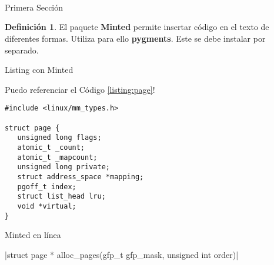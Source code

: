 \documentclass{article}
\title{                                             %
    \vspace{2in}
    \textmd{\textbf{\asignatura \\ \titulo}} \\         %
    \normalsize\vspace{0.1in}\small{\fecha}  \\         %
    \vspace{3in}
}
\author{\textbf{\autor}}                            %
\date{}                                             %
\theoremstyle{plain}
\theoremstyle{definition}
\newtheorem{definition}{Definición}[section]  %
\begin{document}
\maketitle



\newpage
\tableofcontents
\listoflistings      %
\newpage


\begin{section}{Primera Sección}

\begin{definition}
El paquete \textbf{Minted} permite insertar código en el texto de diferentes formas.
Utiliza para ello \textbf{pygments}. Este se debe instalar por separado.
\end{definition}

\begin{subsection}{Listing con Minted}

\lipsum[1]

Puedo referenciar el Código \ref{listing:page}! 

\begin{listing}
\caption{Estructura que representa una Página en Linux}
\begin{verbatim}
#include <linux/mm_types.h>

struct page {
   unsigned long flags;
   atomic_t _count;
   atomic_t _mapcount;
   unsigned long private;
   struct address_space *mapping;
   pgoff_t index;
   struct list_head lru;
   void *virtual;
}
\end{verbatim}
\label{listing:page}
\end{listing}

\lipsum[2]

\end{subsection}

\begin{subsection}{Minted en línea}

\lipsum[3]

|struct page * alloc_pages(gfp_t gfp_mask, unsigned int order)|

\lipsum[4]

\end{subsection}

\end{section}
\end{document}
